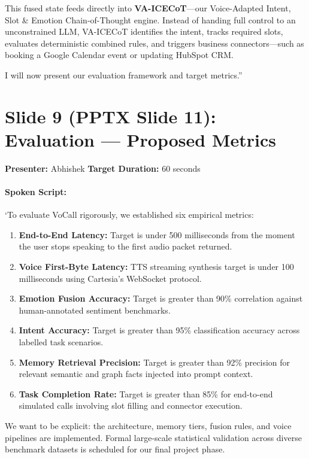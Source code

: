 \documentclass[11pt,a4paper]{article}
\begin{document}
This fused state feeds directly into \textbf{VA-ICECoT}—our Voice-Adapted Intent, Slot \& Emotion Chain-of-Thought engine. Instead of handing full control to an unconstrained LLM, VA-ICECoT identifies the intent, tracks required slots, evaluates deterministic combined rules, and triggers business connectors—such as booking a Google Calendar event or updating HubSpot CRM.

I will now present our evaluation framework and target metrics.''

\newpage

\section*{Slide 9 (PPTX Slide 11): Evaluation — Proposed Metrics}
\textbf{Presenter:} Abhishek \hfill \textbf{Target Duration:} 60 seconds

\paragraph{Spoken Script:}
`To evaluate VoCall rigorously, we established six empirical metrics:
\begin{enumerate}
    \item \textbf{End-to-End Latency:} Target is under 500 milliseconds from the moment the user stops speaking to the first audio packet returned.
    \item \textbf{Voice First-Byte Latency:} TTS streaming synthesis target is under 100 milliseconds using Cartesia's WebSocket protocol.
    \item \textbf{Emotion Fusion Accuracy:} Target is greater than 90\% correlation against human-annotated sentiment benchmarks.
    \item \textbf{Intent Accuracy:} Target is greater than 95\% classification accuracy across labelled task scenarios.
    \item \textbf{Memory Retrieval Precision:} Target is greater than 92\% precision for relevant semantic and graph facts injected into prompt context.
    \item \textbf{Task Completion Rate:} Target is greater than 85\% for end-to-end simulated calls involving slot filling and connector execution.
\end{enumerate}
We want to be explicit: the architecture, memory tiers, fusion rules, and voice pipelines are implemented. Formal large-scale statistical validation across diverse benchmark datasets is scheduled for our final project phase.
\end{document}
